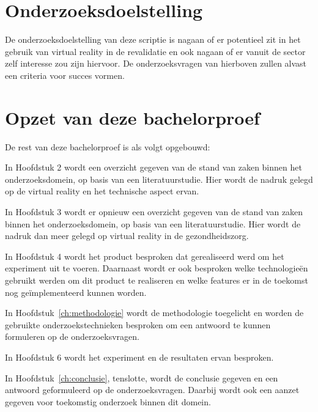 \section{Onderzoeksdoelstelling}
\label{sec:onderzoeksdoelstelling}
De onderzoeksdoelstelling van deze scriptie is nagaan of er potentieel zit in het gebruik van virtual reality in de revalidatie en ook nagaan of er vanuit de sector zelf interesse zou zijn hiervoor. De onderzoeksvragen van hierboven zullen alvast een criteria voor succes vormen.


\section{Opzet van deze bachelorproef}
\label{sec:opzet-bachelorproef}


De rest van deze bachelorproef is als volgt opgebouwd:

In Hoofdstuk 2 wordt een overzicht gegeven van de stand van zaken binnen het onderzoeksdomein, op basis van een literatuurstudie. Hier wordt de nadruk gelegd op de virtual reality en het technische aspect ervan.

In Hoofdstuk 3 wordt er opnieuw een overzicht gegeven van de stand van zaken binnen het onderzoeksdomein, op basis van een literatuurstudie. Hier wordt de nadruk dan meer gelegd op virtual reality in de gezondheidszorg.

In Hoofdstuk 4 wordt het product besproken dat gerealiseerd werd om het experiment uit te voeren. Daarnaast wordt er ook besproken welke technologieën gebruikt werden om dit product te realiseren en welke features er in de toekomst nog geïmplementeerd kunnen worden.

In Hoofdstuk~\ref{ch:methodologie} wordt de methodologie toegelicht en worden de gebruikte onderzoekstechnieken besproken om een antwoord te kunnen formuleren op de onderzoeksvragen.

In Hoofdstuk 6 wordt het experiment en de resultaten ervan besproken.

In Hoofdstuk~\ref{ch:conclusie}, tenslotte, wordt de conclusie gegeven en een antwoord geformuleerd op de onderzoeksvragen. Daarbij wordt ook een aanzet gegeven voor toekomstig onderzoek binnen dit domein.

